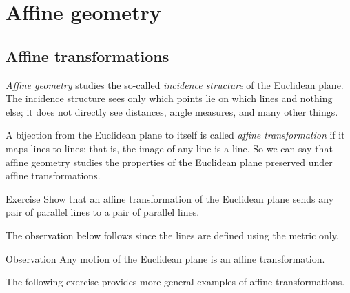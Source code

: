 
\chapter{Affine geometry}\label{chap:trans}

\section{Affine transformations}

\emph{Affine geometry} studies the so-called \emph{incidence structure} of the Euclidean plane.
The incidence structure sees only which points lie on which lines and nothing else;
it does not directly see distances, angle measures, and many other things.

A bijection from the Euclidean plane to itself is called \emph{affine transformation} if it maps lines to lines;
that is, the image of any line is a line.
So we can say that affine geometry studies
the properties of the Euclidean plane preserved under affine transformations.

\begin{thm}{Exercise}\label{ex:affine-par}
Show that an affine transformation of the Euclidean plane sends any pair of parallel lines to a pair of parallel lines.
\end{thm}

The observation below follows since the lines are defined using the metric only.

\begin{thm}{Observation}
Any motion of the Euclidean plane is an affine transformation.
\end{thm}

The following exercise provides more general examples of affine transformations.

